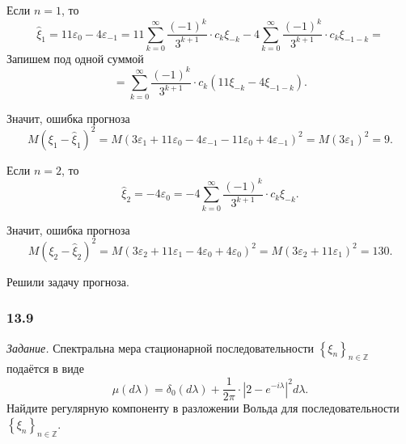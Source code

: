 \begin{enumerate}[label=\alph*)]
  Если $n = 1$, то
  \begin{equation*}
    \hat{ \xi }_1 =
    11 \varepsilon_0 - 4 \varepsilon_{-1} =
    11 \sum \limits_{k = 0}^{ \infty } \frac{ \left( -1 \right)^k}{3^{k + 1}} \cdot c_k \xi_{-k} -
    4 \sum \limits_{k = 0}^{ \infty }
      \frac{ \left( -1 \right)^k}{3^{k + 1}} \cdot c_k \xi_{-1 - k} =
  \end{equation*}
  Запишем под одной суммой
  \begin{equation*}
    = \sum \limits_{k = 0}^{ \infty } \frac{ \left( -1 \right)^k}{3^{k + 1}} \cdot c_k
    \left( 11 \xi_{-k} - 4 \xi_{-1 - k} \right).
  \end{equation*}

  Значит, ошибка прогноза
  \begin{equation*}
    M \left( \xi_1 - \hat{ \xi }_1 \right)^2 =
    M \left(
      3 \varepsilon_1 + 11 \varepsilon_0 - 4 \varepsilon_{-1} - 11 \varepsilon_0 +
      4 \varepsilon_{-1}
    \right)^2 =
    M \left( 3 \varepsilon_1 \right)^2 =
    9.
  \end{equation*}

  Если $n = 2$, то
  \begin{equation*}
    \hat{ \xi }_2 =
    -4 \varepsilon_0 =
    -4 \sum \limits_{k = 0}^{ \infty } \frac{ \left( -1 \right)^k}{3^{k + 1}} \cdot c_k \xi_{-k}.
  \end{equation*}

  Значит, ошибка прогноза
  \begin{equation*}
    M \left( \xi_2 - \hat{ \xi }_2 \right)^2 =
    M \left( 3 \varepsilon_2 + 11 \varepsilon_1 - 4 \varepsilon_0 + 4 \varepsilon_0 \right)^2 =
    M \left( 3 \varepsilon_2 + 11 \varepsilon_1 \right)^2 =
    130.
  \end{equation*}
\end{enumerate}
Решили задачу прогноза.

\subsubsection*{13.9}

\textit{Задание.}
Спектральна мера стационарной последовательности $ \left\{ \xi_n \right\}_{n \in \mathbb{Z}}$
подаётся в виде
\begin{equation*}
  \mu \left( d \lambda \right) =
  \delta_0 \left( d \lambda \right) +
  \frac{1}{2 \pi } \cdot \left| 2 - e^{-i \lambda } \right|^2 d \lambda.
\end{equation*}
Найдите регулярную компоненту в разложении Вольда для последовательности
$ \left\{ \xi_n \right\}_{n \in \mathbb{Z}}$.


